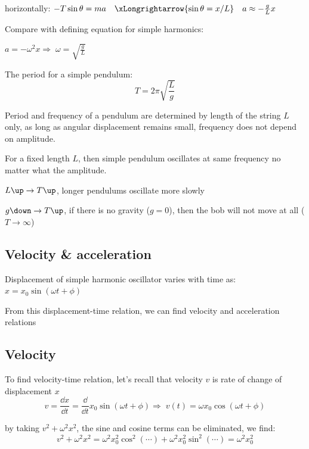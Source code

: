 \documentclass[a4paper,12pt]{book}
\newcommand{\cmt}{}
\newcommand{\RA}{\Rightarrow\;}
\newcommand{\ra}{\rightarrow}
\newcommand{\tcbhighmath}[1]{\boxed{#1}}
\newcommand{\cmt}{}
\begin{document}
horizontally: $-T\sin\theta = ma \quad \xLongrightarrow{\sin\theta=x/L} \quad a \approx -\frac{g}{L}x$

Compare with defining equation for simple harmonics:

{

\centering

$a=-\omega^2x \RA \omega = \sqrt{\frac{g}{L}}$

}
	
The period for a simple pendulum: $$\tcbhighmath{T= 2\pi\sqrt{\frac{L}{g}}}$$

Period and frequency of a pendulum are determined by length of the string $L$ only, as long as angular displacement remains small, frequency does not depend on amplitude.

For a fixed length $L$, then simple pendulum oscillates at same frequency no matter what the amplitude.

\cmt $L \up \ra T \up$, longer pendulums oscillate more slowly

\cmt $g \down \ra T \up$, if there is no gravity ($g=0$), then the bob will not move at all  ($T\to \infty$)

\subsection{Velocity \& acceleration}

Displacement of simple harmonic oscillator varies with time as: $x=x_0\sin(\omega t + \phi)$

From this displacement-time relation, we can find velocity and acceleration relations

\subsection*{Velocity}

To find velocity-time relation, let's recall that velocity $v$ is rate of change of displacement $x$
\begin{equation*}
	v = \frac{\dd x}{\dd t} = \frac{\dd}{\dd t} x_0\sin(\omega t+\phi) \RA \tcbhighmath{v(t) = \omega x_0 \cos(\omega t+\phi)}
\end{equation*}

by taking $v^2 + \omega^2 x^2$, the sine and cosine terms can be eliminated, we find:
\begin{equation*}
	v^2 + \omega^2 x^2 = \omega^2 x_0^2 \cos^2(\cdots) + \omega^2 x_0^2 \sin^2(\cdots) = \omega^2 x_0^2
\end{equation*}
\end{document}
